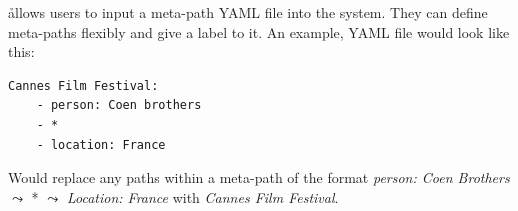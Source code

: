 \h allows users to input a meta-path YAML file into the system.
They can define meta-paths flexibly and give a label to it. An example, YAML file would look
like this:
\begin{verbatim}
Cannes Film Festival:
    - person: Coen brothers
    - *
    - location: France
\end{verbatim}

Would replace any paths within a meta-path of the format \textit{person: Coen Brothers} 
$\leadsto$ * $\leadsto$ \textit{Location: France} with \textit{Cannes Film Festival}.
